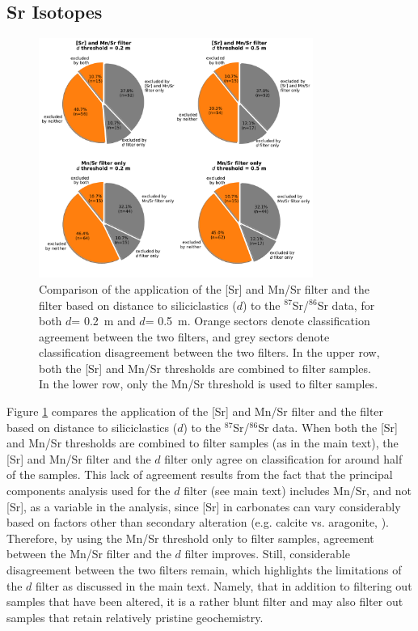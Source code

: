 \documentclass[11pt,letterpaper]{article}
\newcommand{\SrSr}{$^{87}$Sr/$^{86}$Sr\xspace}
\newcommand{\dsil}{$d$\xspace}
\begin{document}
\clearpage

\subsection*{Sr Isotopes}

\begin{figure}[h!]
\begin{center}
	\includegraphics[width=0.8\textwidth]{Figures/Filter_Comparison.pdf}
	\caption{Comparison of the application of the [Sr] and Mn/Sr filter and the filter based on distance to siliciclastics (\dsil) to the \SrSr data, for both \dsil = 0.2~m and \dsil = 0.5~m. Orange sectors denote classification agreement between the two filters, and grey sectors denote classification disagreement between the two filters. In the upper row, both the [Sr] and Mn/Sr thresholds are combined to filter samples. In the lower row, only the Mn/Sr threshold is used to filter samples.}
	\label{fig:Filter_Comparison}
\end{center}
\end{figure}

Figure \ref{fig:Filter_Comparison} compares the application of the [Sr] and Mn/Sr filter and the filter based on distance to siliciclastics (\dsil) to the \SrSr data. When both the [Sr] and Mn/Sr thresholds are combined to filter samples (as in the main text), the [Sr] and Mn/Sr filter and the \dsil filter only agree on classification for around half of the samples. This lack of agreement results from the fact that the principal components analysis used for the \dsil filter (see main text) includes Mn/Sr, and not [Sr], as a variable in the analysis, since [Sr] in carbonates can vary considerably based on factors other than secondary alteration (e.g. calcite vs. aragonite, \citealp{Husson2015b}). Therefore, by using the Mn/Sr threshold only to filter samples, agreement between the Mn/Sr filter and the \dsil filter improves. Still, considerable disagreement between the two filters remain, which highlights the limitations of the \dsil filter as discussed in the main text. Namely, that in addition to filtering out samples that have been altered, it is a rather blunt filter and may also filter out samples that retain relatively pristine geochemistry.
\end{document}

